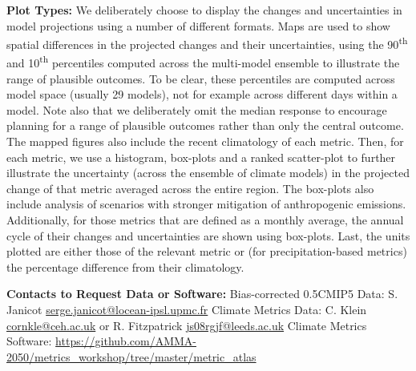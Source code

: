 \textbf{Plot Types:} We deliberately choose to display the changes and uncertainties in model projections using a number of different formats. Maps are used to show spatial differences in the projected changes and their uncertainties, using the 90\textsuperscript{th} and 10\textsuperscript{th} percentiles computed across the multi-model ensemble to illustrate the range of plausible outcomes. To be clear, these percentiles are computed across model space (usually 29 models), not for example across different days within a model. Note also that we deliberately omit the median response to encourage planning for a range of plausible outcomes rather than only the central outcome. The mapped figures also include the recent climatology of each metric. Then, for each metric, we use a histogram, box-plots and a ranked scatter-plot to further illustrate the uncertainty (across the ensemble of climate models) in the projected change of that metric averaged across the entire region. The box-plots also include analysis of scenarios with stronger mitigation of anthropogenic emissions. Additionally, for those metrics that are defined as a monthly average, the annual cycle of their changes and uncertainties are shown using box-plots. Last, the units plotted are either those of the relevant metric or (for precipitation-based metrics) the percentage difference from their climatology.

\textbf{Contacts to Request Data or Software:}
Bias-corrected 0.5\textdegree CMIP5 Data: S. Janicot \href{mailto:serge.janicot@locean-ipsl.upmc.fr}{serge.janicot@locean-ipsl.upmc.fr}
Climate Metrics Data: C. Klein \href{mailto:cornkle@ceh.ac.uk}{cornkle@ceh.ac.uk} or R. Fitzpatrick \href{mailto:js08rgjf@leeds.ac.uk}{js08rgjf@leeds.ac.uk}
Climate Metrics Software:
\url{https://github.com/AMMA-2050/metrics_workshop/tree/master/metric_atlas}
